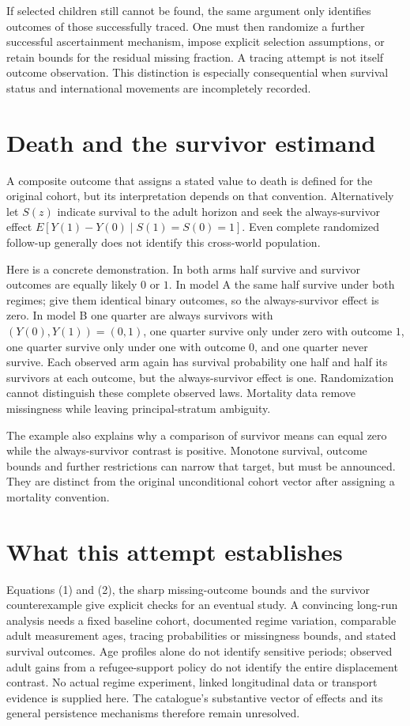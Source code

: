 \documentclass[11pt,a4paper]{article}
\begin{document}
If selected children still cannot be found, the same argument only identifies outcomes of those successfully traced. One must then randomize a further successful ascertainment mechanism, impose explicit selection assumptions, or retain bounds for the residual missing fraction. A tracing attempt is not itself outcome observation. This distinction is especially consequential when survival status and international movements are incompletely recorded.

\section{Death and the survivor estimand}
A composite outcome that assigns a stated value to death is defined for the original cohort, but its interpretation depends on that convention. Alternatively let $S(z)$ indicate survival to the adult horizon and seek the always-survivor effect $E[Y(1)-Y(0)\mid S(1)=S(0)=1]$. Even complete randomized follow-up generally does not identify this cross-world population.

Here is a concrete demonstration. In both arms half survive and survivor outcomes are equally likely $0$ or $1$. In model A the same half survive under both regimes; give them identical binary outcomes, so the always-survivor effect is zero. In model B one quarter are always survivors with $(Y(0),Y(1))=(0,1)$, one quarter survive only under zero with outcome $1$, one quarter survive only under one with outcome $0$, and one quarter never survive. Each observed arm again has survival probability one half and half its survivors at each outcome, but the always-survivor effect is one. Randomization cannot distinguish these complete observed laws. Mortality data remove missingness while leaving principal-stratum ambiguity.

The example also explains why a comparison of survivor means can equal zero while the always-survivor contrast is positive. Monotone survival, outcome bounds and further restrictions can narrow that target, but must be announced. They are distinct from the original unconditional cohort vector after assigning a mortality convention.

\section{What this attempt establishes}
Equations (1) and (2), the sharp missing-outcome bounds and the survivor counterexample give explicit checks for an eventual study. A convincing long-run analysis needs a fixed baseline cohort, documented regime variation, comparable adult measurement ages, tracing probabilities or missingness bounds, and stated survival outcomes. Age profiles alone do not identify sensitive periods; observed adult gains from a refugee-support policy do not identify the entire displacement contrast. No actual regime experiment, linked longitudinal data or transport evidence is supplied here. The catalogue's substantive vector of effects and its general persistence mechanisms therefore remain unresolved.
\end{document}
